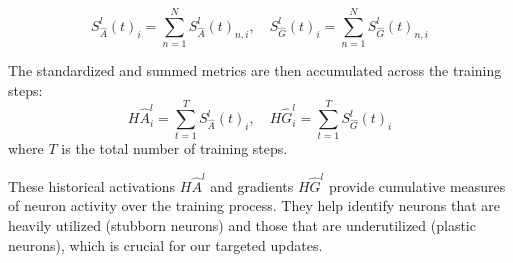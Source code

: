 \[
S^l_{\hat{A}}(t)_i = \sum_{n=1}^{N} S^l_{\hat{A}}(t)_{n,i}, \quad S^l_{\hat{G}}(t)_i = \sum_{n=1}^{N} S^l_{\hat{G}}(t)_{n,i}
\]


The standardized and summed metrics are then accumulated across the training steps:
\[
H\hat{A}^l_i = \sum_{t=1}^{T} S^l_{\hat{A}}(t)_i, \quad H\hat{G}^l_i = \sum_{t=1}^{T} S^l_{\hat{G}}(t)_i
\]
where \( T \) is the total number of training steps.

These historical activations \( H\hat{A}^l \) and gradients \( H\hat{G}^l \) provide cumulative measures of neuron activity over the training process. They help identify neurons that are heavily utilized (stubborn neurons) and those that are underutilized (plastic neurons), which is crucial for our targeted updates.





